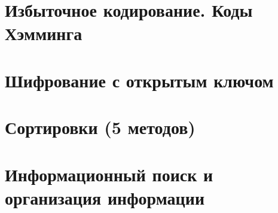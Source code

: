 \documentclass[12pt, fleqn]{article}
\begin{document}














\section{Избыточное кодирование. Коды Хэмминга}


\section{Шифрование с открытым ключом}


\section{Сортировки (5 методов)}


\section{Информационный поиск и организация информации}
\end{document}
